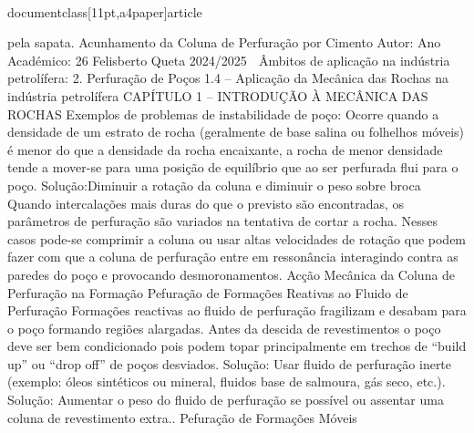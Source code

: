 \\documentclass[11pt,a4paper]{article}
\begin{document}
pela sapata.
Acunhamento
da Coluna de
Perfuração por
Cimento 
Autor:
Ano Académico:
26
Felisberto Queta
2024/2025

 Âmbitos de aplicação na indústria petrolífera:
2. Perfuração de Poços
1.4 – Aplicação da Mecânica das Rochas na indústria petrolífera
CAPÍTULO 1 
–
 INTRODUÇÃO À MECÂNICA DAS ROCHAS
Exemplos de problemas de instabilidade de poço:
Ocorre quando a densidade de um 
estrato de rocha (geralmente de base 
salina ou folhelhos móveis) é menor do 
que a densidade da rocha encaixante, a 
rocha de menor densidade tende a 
mover-se para uma posição de equilíbrio 
que ao ser perfurada flui para o poço.
Solução:Diminuir a rotação da coluna e 
diminuir o peso sobre broca
Quando intercalações mais duras do que o 
previsto são encontradas, os parâmetros 
de perfuração são variados na tentativa de 
cortar a rocha. Nesses casos pode-se 
comprimir a coluna ou usar altas 
velocidades de rotação que podem fazer 
com que a coluna de perfuração entre em 
ressonância interagindo contra as paredes 
do poço e provocando desmoronamentos.
Acção Mecânica
da Coluna de
Perfuração na
Formação
Pefuração de 
Formações 
Reativas ao 
Fluido de 
Perfuração
Formações reactivas ao fluido de perfuração 
fragilizam e desabam para o poço formando 
regiões alargadas. Antes da descida de 
revestimentos o poço deve ser bem 
condicionado pois podem topar 
principalmente em trechos de “build up” ou 
“drop off” de poços desviados.
Solução: Usar fluido de perfuração inerte 
(exemplo: óleos sintéticos ou mineral, 
fluidos base de salmoura, gás seco, etc.).
Solução: Aumentar o peso do fluido 
de perfuração se possível ou 
assentar uma coluna de 
revestimento extra..
Pefuração de 
Formações 
Móveis\
\end{document}
